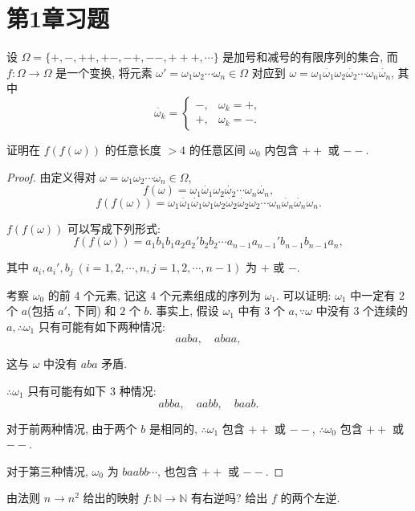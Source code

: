 \documentclass{ctexart}
\begin{document}
\section{第1章习题}
\begin{exercise}[5.1]
    设 $\Omega=\{+,-,++,+-,-+,--,+++,\cdots\}$ 是加号和减号的有限序列的集合, 而 $f:\Omega\to\Omega$ 是一个变换, 将元素 $\omega'=\omega_1\omega_2\cdots\omega_n\in\Omega$ 对应到 $\omega=\omega_1\dot{\omega_1}\omega_2\dot{\omega_2}\cdots\omega_n\dot{\omega_n}$, 其中
    \[\dot{\omega_k}=\begin{cases}
        -, & \omega_k=+, \\
        +, & \omega_k=-.
    \end{cases}\]
    
    证明在 $f(f(\omega))$ 的任意长度 $>4$ 的任意区间 $\omega_0$ 内包含 $++$ 或 $--$.    
\end{exercise}
\begin{proof}
    由定义得对 $\omega=\omega_1\omega_2\cdots\omega_n\in\Omega$,
    \[f(\omega)=\omega_1\dot{\omega_1}\omega_2\dot{\omega_2}\cdots\omega_n\dot{\omega_n},\]
    \[f(f(\omega))=\omega_1\dot{\omega_1}\dot{\omega_1}\omega_1\omega_2\dot{\omega_2}\dot{\omega_2}\omega_2\cdots\omega_n\dot{\omega_n}\dot{\omega_n}\omega_n.\]

    $f(f(\omega))$ 可以写成下列形式:
    \[f(f(\omega))=a_1b_1b_1a_2a_2'b_2b_2\cdots a_{n-1}a_{n-1}'b_{n-1}b_{n-1}a_n,\]

    其中 $a_i,a_i',b_j\ (i=1,2,\cdots,n,j=1,2,\cdots,n-1)$ 为 $+$ 或 $-$.

    考察 $\omega_0$ 的前 $4$ 个元素, 记这 $4$ 个元素组成的序列为 $\omega_1$. 可以证明: $\omega_1$ 中一定有 $2$ 个 $a$(包括 $a'$, 下同) 和 $2$ 个 $b$. 事实上, 假设 $\omega_1$ 中有 $3$ 个 $a,\because \omega$ 中没有 $3$ 个连续的 $a,\therefore \omega_1$ 只有可能有如下两种情况:
    \[aaba,\quad abaa,\]

    这与 $\omega$ 中没有 $aba$ 矛盾.

    $\therefore \omega_1$ 只有可能有如下 $3$ 种情况:
    \[abba,\quad aabb,\quad baab.\]

    对于前两种情况, 由于两个 $b$ 是相同的, $\therefore \omega_1$ 包含 $++$ 或 $--$, $\therefore \omega_0$ 包含 $++$ 或 $--$.

    对于第三种情况, $\omega_0$ 为 $baabb\cdots$, 也包含 $++$ 或 $--$.
\end{proof}
\begin{exercise}[5.2]
    由法则 $n\to n^2$ 给出的映射 $f:\mathbb{N}\to\mathbb{N}$ 有右逆吗? 给出 $f$ 的两个左逆.
\end{exercise}
\end{document}
